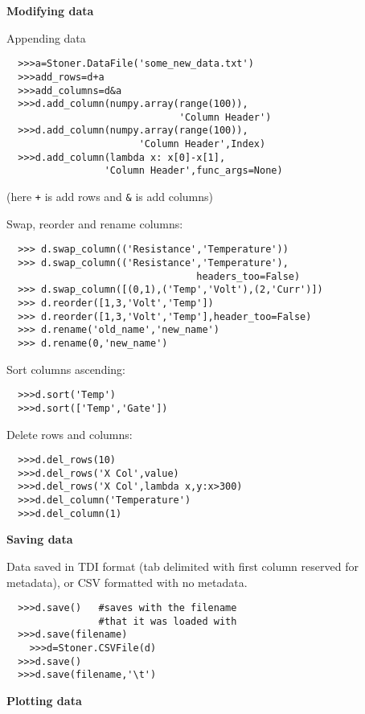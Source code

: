 \documentclass[a4paper,9pt,threecolumn,landscape]{scrartcl}
\begin{document}
\begin{multicols}{3}
{\vspace{0.5cm}
\textbf {Modifying data}
\vspace{0.2cm}\normalfont

Appending data
\begin{verbatim}
  >>>a=Stoner.DataFile('some_new_data.txt')
  >>>add_rows=d+a
  >>>add_columns=d&a
  >>>d.add_column(numpy.array(range(100)),
                              'Column Header')
  >>>d.add_column(numpy.array(range(100)),
                       'Column Header',Index)
  >>>d.add_column(lambda x: x[0]-x[1],
                 'Column Header',func_args=None)
\end{verbatim}
(here \verb:+: is add rows and \verb:&: is add columns)
\vspace{0.4cm}

Swap, reorder and rename columns:
\begin{verbatim}
  >>> d.swap_column(('Resistance','Temperature'))
  >>> d.swap_column(('Resistance','Temperature'),
                                 headers_too=False)
  >>> d.swap_column([(0,1),('Temp','Volt'),(2,'Curr')])
  >>> d.reorder([1,3,'Volt','Temp'])
  >>> d.reorder([1,3,'Volt','Temp'],header_too=False)
  >>> d.rename('old_name','new_name')
  >>> d.rename(0,'new_name')
\end{verbatim}

Sort columns ascending:
\begin{verbatim}
  >>>d.sort('Temp')
  >>>d.sort(['Temp','Gate'])
\end{verbatim}

Delete rows and columns:
\begin{verbatim}
  >>>d.del_rows(10)
  >>>d.del_rows('X Col',value)
  >>>d.del_rows('X Col',lambda x,y:x>300)
  >>>d.del_column('Temperature')
  >>>d.del_column(1)
\end{verbatim}

\vspace{0.5cm}
\textbf {Saving data}
\vspace{0.2cm}\normalfont

Data saved in TDI format (tab delimited with first column reserved for metadata), or CSV formatted with no metadata.
\begin{verbatim}
  >>>d.save()   #saves with the filename 
                #that it was loaded with
  >>>d.save(filename)
    >>>d=Stoner.CSVFile(d)
  >>>d.save()
  >>>d.save(filename,'\t')
\end{verbatim}

\vspace{0.5cm}
\textbf {Plotting data}
\vspace{0.2cm}\normalfont

}
\end{multicols}
\end{document}
